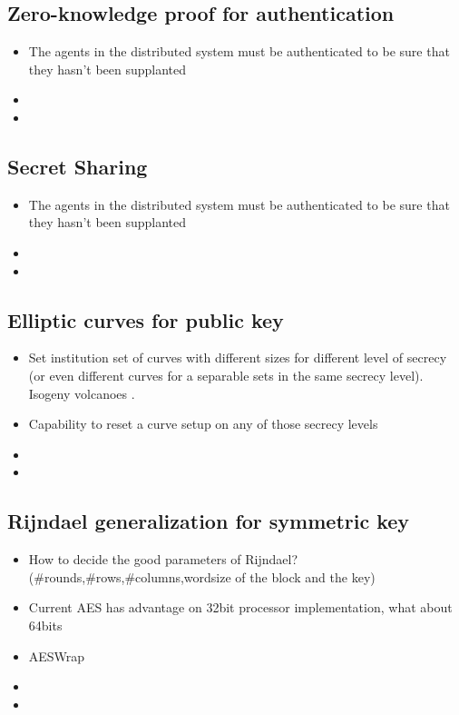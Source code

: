 \documentclass[10pt,a4paper,twoside]{llncs}
\begin{document}
%
\subsection{Zero-knowledge proof for authentication \label{sec:auth}}
\begin{itemize}
 \item The agents in the distributed system must be authenticated to be sure that they hasn't been supplanted
 \item 
 \item 
\end{itemize}

%
\subsection{Secret Sharing \label{sec:secretSharing}}
\begin{itemize}
 \item The agents in the distributed system must be authenticated to be sure that they hasn't been supplanted
 \item 
 \item 
\end{itemize}

%
\subsection{Elliptic curves for public key \label{sec:ecpk}}

\begin{itemize}
 \item Set institution set of curves with different sizes for different level of secrecy (or even different curves for a separable sets in the same secrecy level). Isogeny volcanoes \cite{secRickShareECs}.
 \item Capability to reset a curve setup on any of those secrecy levels 
 \item 
 \item 
\end{itemize}

%
\subsection{Rijndael generalization for symmetric key \label{sec:gRijndael}}

\begin{itemize}
 \item How to decide the good parameters of Rijndael? (\#rounds,\#rows,\#columns,wordsize of the block and the key) \cite{gRijndael}
 \item Current AES has advantage on 32bit processor implementation, what about 64bits
 \item AESWrap \cite{rfc3394}
 \item 
 \item 
\end{itemize}
\end{document}
